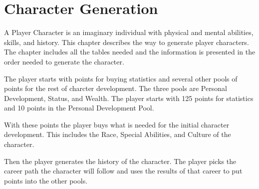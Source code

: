 \chapter{Character Generation}

A {Player Character} is an imaginary individual
with physical and mental abilities, skills, and history. This chapter
describes the way to generate player characters. The chapter
includes all the tables needed and the information is presented in
the order needed to generate the character.

The player starts with points for buying statistics and several other pools 
of points for the rest of charcter development. The three 
pools are Personal Development, Status, and Wealth. The player starts 
with 125 points for statistics and 10 points in the Personal 
Development Pool. 

With these points the player buys what is needed for the initial 
character development. This includes the Race, Special Abilities, and 
Culture of the character. 

Then the player generates the history of the character. The player 
picks the career path the character will follow and uses the results 
of that career to put points into the other pools. 

